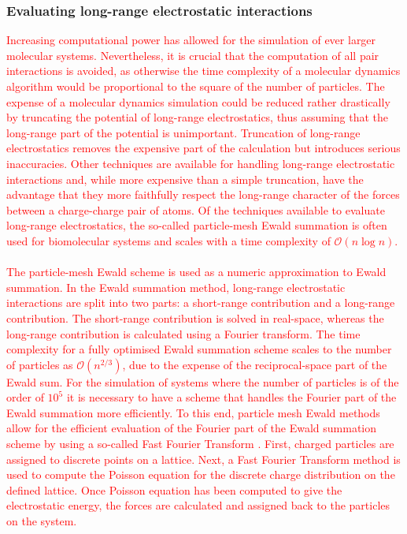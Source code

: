 \subsubsection{Evaluating long-range electrostatic interactions}
\textcolor{red}{Increasing computational power has allowed for the simulation of ever larger molecular systems. Nevertheless, it is crucial that the computation of all pair interactions is avoided, as otherwise the time complexity of a molecular dynamics algorithm would be proportional to the square of the number of particles. The expense of a molecular dynamics simulation could be reduced rather drastically by truncating the potential of long-range electrostatics, thus assuming that the long-range part of the potential is unimportant. Truncation of long-range electrostatics removes the expensive part of the calculation but introduces serious inaccuracies. Other techniques are available for handling long-range electrostatic interactions and, while more expensive than a simple truncation, have the advantage that they more faithfully respect the long-range character of the forces between a charge-charge pair of atoms. Of the techniques available to evaluate long-range electrostatics, the so-called particle-mesh Ewald summation is often used for biomolecular systems and scales with a time complexity of $\mathcal{O}(n\log{}n)$.
\\
\\
The particle-mesh Ewald scheme is used as a numeric approximation to Ewald summation. In the Ewald summation method, long-range electrostatic interactions are split into two parts: a short-range contribution and a long-range contribution. The short-range contribution is solved in real-space, whereas the long-range contribution is calculated using a Fourier transform. The time complexity for a fully optimised Ewald summation scheme scales to the number of particles as $\mathcal{O}(n^{2/3})$, due to the expense of the reciprocal-space part of the Ewald sum. For the simulation of systems where the number of particles is of the order of $10^5$ it is necessary to have a scheme that handles the Fourier part of the Ewald summation more efficiently. To this end, particle mesh Ewald methods allow for the efficient evaluation of the Fourier part of the Ewald summation scheme by using a so-called Fast Fourier Transform \cite{Darden:1993aa}. First, charged particles are assigned to discrete points on a lattice. Next, a Fast Fourier Transform method is used to compute the Poisson equation for the discrete charge distribution on the defined lattice. Once Poisson equation has been computed to give the electrostatic energy, the forces are calculated and assigned back to the particles on the system.}


